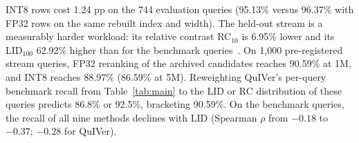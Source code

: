 INT8 rows cost 1.24 pp on the 744 evaluation queries (95.13\% versus 96.37\% with FP32 rows on the same rebuilt index and width). The held-out stream is a measurably harder workload: its relative contrast RC$_{10}$ is 6.95\% lower and its LID$_{100}$ 62.92\% higher than for the benchmark queries~\cite{he2012difficulty,aumuller2021lid}. On 1,000 pre-registered stream queries, FP32 reranking of the archived candidates reaches 90.59\% at 1M, and INT8 reaches 88.97\% (86.59\% at 5M). Reweighting QuIVer's per-query benchmark recall from Table~\ref{tab:main} to the LID or RC distribution of these queries predicts 86.8\% or 92.5\%, bracketing 90.59\%. On the benchmark queries, the recall of all nine methods declines with LID (Spearman $\rho$ from $-0.18$ to $-0.37$; $-0.28$ for QuIVer).
